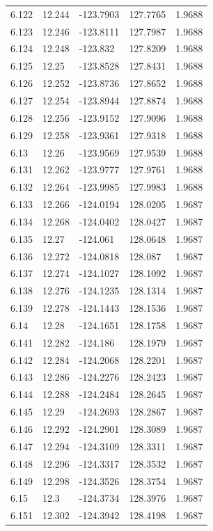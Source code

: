 \begin{tabular}{lllll}
6.122 & 12.244 & -123.7903 & 127.7765 & 1.9688 \\
6.123 & 12.246 & -123.8111 & 127.7987 & 1.9688 \\
6.124 & 12.248 & -123.832 & 127.8209 & 1.9688 \\
6.125 & 12.25 & -123.8528 & 127.8431 & 1.9688 \\
6.126 & 12.252 & -123.8736 & 127.8652 & 1.9688 \\
6.127 & 12.254 & -123.8944 & 127.8874 & 1.9688 \\
6.128 & 12.256 & -123.9152 & 127.9096 & 1.9688 \\
6.129 & 12.258 & -123.9361 & 127.9318 & 1.9688 \\
6.13 & 12.26 & -123.9569 & 127.9539 & 1.9688 \\
6.131 & 12.262 & -123.9777 & 127.9761 & 1.9688 \\
6.132 & 12.264 & -123.9985 & 127.9983 & 1.9688 \\
6.133 & 12.266 & -124.0194 & 128.0205 & 1.9687 \\
6.134 & 12.268 & -124.0402 & 128.0427 & 1.9687 \\
6.135 & 12.27 & -124.061 & 128.0648 & 1.9687 \\
6.136 & 12.272 & -124.0818 & 128.087 & 1.9687 \\
6.137 & 12.274 & -124.1027 & 128.1092 & 1.9687 \\
6.138 & 12.276 & -124.1235 & 128.1314 & 1.9687 \\
6.139 & 12.278 & -124.1443 & 128.1536 & 1.9687 \\
6.14 & 12.28 & -124.1651 & 128.1758 & 1.9687 \\
6.141 & 12.282 & -124.186 & 128.1979 & 1.9687 \\
6.142 & 12.284 & -124.2068 & 128.2201 & 1.9687 \\
6.143 & 12.286 & -124.2276 & 128.2423 & 1.9687 \\
6.144 & 12.288 & -124.2484 & 128.2645 & 1.9687 \\
6.145 & 12.29 & -124.2693 & 128.2867 & 1.9687 \\
6.146 & 12.292 & -124.2901 & 128.3089 & 1.9687 \\
6.147 & 12.294 & -124.3109 & 128.3311 & 1.9687 \\
6.148 & 12.296 & -124.3317 & 128.3532 & 1.9687 \\
6.149 & 12.298 & -124.3526 & 128.3754 & 1.9687 \\
6.15 & 12.3 & -124.3734 & 128.3976 & 1.9687 \\
6.151 & 12.302 & -124.3942 & 128.4198 & 1.9687 \\

\end{tabular}
